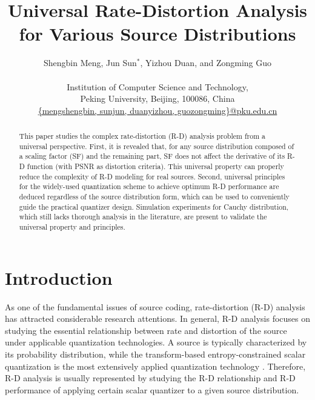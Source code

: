 \documentclass[smallabstract,smallcaptions]{dccpaper}
\begin{document}
\title
{\large
\textbf{Universal Rate-Distortion Analysis for Various Source Distributions}
}

\author{%
Shengbin Meng, Jun Sun$^{\ast}$, Yizhou Duan, and Zongming Guo\\[0.5em]
{\small\begin{minipage}{\linewidth}\begin{center}
\begin{tabular}{ccc}
Institution of Computer Science and Technology, \\
Peking University, Beijing, 100086, China\\
\url{{mengshengbin, sunjun, duanyizhou, guozongming}@pku.edu.cn}
\end{tabular}
\end{center}\end{minipage}}
}

\maketitle
\thispagestyle{empty}

\begin{abstract}
This paper studies the complex rate-distortion (R-D) analysis problem from a universal perspective. First, it is revealed that, for any source distribution composed of a scaling factor (SF) and the remaining part, SF does not affect the derivative of its R-D function (with PSNR as distortion criteria). This universal property can properly reduce the complexity of R-D modeling for real sources. Second, universal principles for the widely-used quantization scheme to achieve optimum R-D performance are deduced regardless of the source distribution form, which can be used to conveniently guide the practical quantizer design. Simulation experiments for Cauchy distribution, which still lacks thorough analysis in the literature, are present to validate the universal property and principles.
\end{abstract}

\section{Introduction}

\let\thefootnote\relax{}

As one of the fundamental issues of source coding, rate-distortion (R-D) analysis has attracted considerable research attentions. In general, R-D analysis focuses on studying the essential relationship between rate and distortion of the source under applicable quantization technologies. A source is typically characterized by its probability distribution, while the transform-based entropy-constrained scalar quantization is the most extensively applied quantization technology \cite{Hang_TCSVT1997}. Therefore, R-D analysis is usually represented by studying the R-D relationship and R-D performance of applying certain scalar quantizer to a given source distribution.
\end{document}

